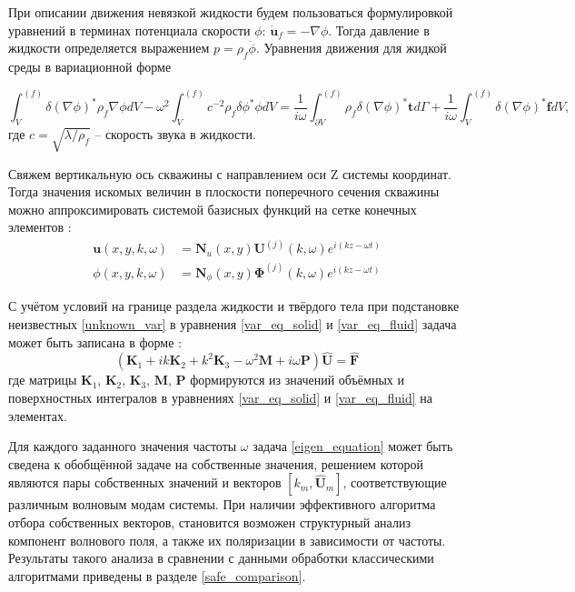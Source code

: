 \documentclass[a4paper,11pt]{article}
\begin{document}
При описании движения невязкой жидкости будем пользоваться формулировкой уравнений в терминах потенциала скорости $\phi$: $\dot{\mathbf{u}}_f = - \nabla \phi$. Тогда давление в жидкости определяется выражением $p = \rho_f \dot{\phi}$. Уравнения движения для жидкой среды в вариационной форме 

\begin{equation}
\int_{V}^{(f)} \delta (\nabla\phi)^* \rho_f  \nabla \phi dV - \omega^2 \int_{V}^{(f)}  c^{-2} \rho_f \delta \phi^*  \phi dV = \frac{1}{i\omega}\int_{\partial V}^{(f)} \rho_f \delta(\nabla \phi)^* \mathbf{t} d\Gamma + \frac{1}{i\omega} \int_{V}^{(f)} \delta(\nabla \phi)^* \mathbf{f} dV, \label{var_eq_fluid}
\end{equation}
где $c = \sqrt{\lambda/\rho_f}$ -- скорость звука в жидкости.

Свяжем вертикальную ось скважины с направлением оси Z системы координат. Тогда значения искомых величин в плоскости поперечного сечения скважины можно аппроксимировать системой базисных функций на сетке конечных элементов \cite{Zienkiewicz2000}:
\begin{equation}
\begin{split}
\mathbf{u}(x,y,k,\omega) & = \mathbf{N}_u(x,y) \mathbf{U}^{(j)}(k,\omega) e^{i(kz-\omega t)} \\
\phi(x,y,k,\omega) & = \mathbf{N}_{\phi}(x,y) \mathbf{\Phi}^{(j)}(k,\omega) e^{i(kz-\omega t)}
\end{split} \label{unknown_var}
\end{equation}

С учётом условий на границе раздела жидкости и твёрдого тела при подстановке неизвестных \eqref{unknown_var} в уравнения \eqref{var_eq_solid} и \eqref{var_eq_fluid} задача может быть записана в форме \cite{Bartoli2006,Treyssede2013}:
\begin{equation}
(\mathbf{K}_1 + i k \mathbf{K}_2 + k^2 \mathbf{K}_3 - \omega^2 \mathbf{M} + i \omega \mathbf{P}) \hat{\mathbf{U}} = \hat{\mathbf{F}} \label{eigen_equation}
\end{equation}
где матрицы $\mathbf{K}_1$, $\mathbf{K}_2$, $\mathbf{K}_3$, $\mathbf{M}$, $\mathbf{P}$ формируются из значений объёмных и поверхностных интегралов в уравнениях \eqref{var_eq_solid} и \eqref{var_eq_fluid} на элементах.

Для каждого заданного значения частоты $\omega$ задача \eqref{eigen_equation} может быть сведена к обобщённой задаче на собственные значения, решением которой являются пары собственных значений и векторов $[k_m, \hat{\mathbf{U}}_m]$, соответствующие различным волновым модам системы. При наличии эффективного алгоритма отбора собственных векторов, становится возможен структурный анализ компонент волнового поля, а также их поляризации в зависимости от частоты. Результаты такого анализа в сравнении с данными обработки классическими алгоритмами приведены в разделе \ref{safe_comparison}.
\end{document}
